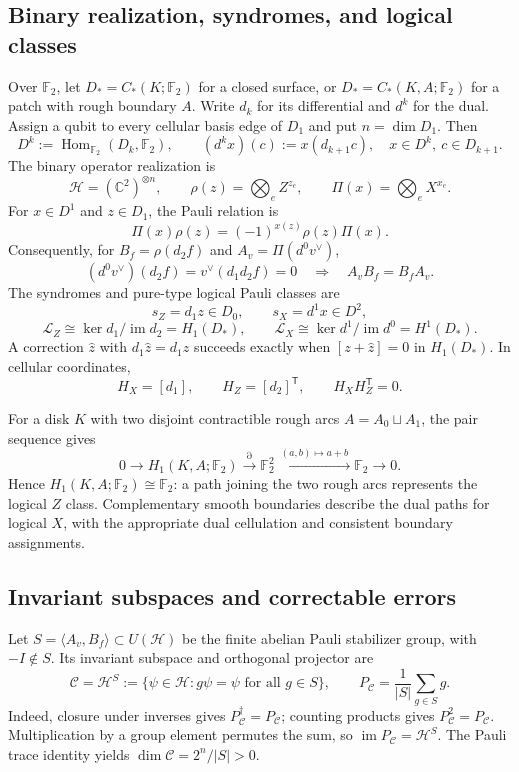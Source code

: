 \subsection*{Binary realization, syndromes, and logical classes}

Over $\mathbb F_2$, let $D_*=C_*(K;\mathbb F_2)$ for a closed surface,
or $D_*=C_*(K,A;\mathbb F_2)$ for a patch with rough boundary $A$.
Write $d_k$ for its differential and $d^k$ for the dual. Assign a qubit
to every cellular basis edge of $D_1$ and put $n=\dim D_1$. Then
\[
 D^k:=\operatorname{Hom}_{\mathbb F_2}(D_k,\mathbb F_2),
 \qquad (d^kx)(c):=x(d_{k+1}c),
 \quad x\in D^k,\ c\in D_{k+1}.
\]
The binary operator realization is
\[
 \mathcal H=(\mathbb C^2)^{\otimes n},
 \qquad \rho(z)=\bigotimes_e Z^{z_e},
 \qquad \Pi(x)=\bigotimes_e X^{x_e}.
\]
For $x\in D^1$ and $z\in D_1$, the Pauli relation is
\[
 \Pi(x)\rho(z)=(-1)^{x(z)}\rho(z)\Pi(x).
\]
Consequently, for $B_f=\rho(d_2f)$ and $A_v=\Pi(d^0v^\vee)$,
\[
 (d^0v^\vee)(d_2f)=v^\vee(d_1d_2f)=0
 \quad\Longrightarrow\quad A_vB_f=B_fA_v.
\]
The syndromes and pure-type logical Pauli classes are
\[
 s_Z=d_1z\in D_0,\qquad s_X=d^1x\in D^2,
\]
\[
 \mathcal L_Z\cong\ker d_1/\operatorname{im}d_2=H_1(D_*),
 \qquad \mathcal L_X\cong\ker d^1/\operatorname{im}d^0=H^1(D_*).
\]
A correction $\widehat z$ with $d_1\widehat z=d_1z$ succeeds exactly when
$[z+\widehat z]=0$ in $H_1(D_*)$. In cellular coordinates,
\[
 H_X=[d_1],\qquad H_Z=[d_2]^{\mathsf T},\qquad
 H_XH_Z^{\mathsf T}=0.
\]

For a disk $K$ with two disjoint contractible rough arcs
$A=A_0\sqcup A_1$, the pair sequence gives
\[
 0\longrightarrow H_1(K,A;\mathbb F_2)\xrightarrow{\partial}
 \mathbb F_2^2\xrightarrow{\ (a,b)\mapsto a+b\ }\mathbb F_2
 \longrightarrow0.
\]
Hence $H_1(K,A;\mathbb F_2)\cong\mathbb F_2$: a path joining the two
rough arcs represents the logical $Z$ class. Complementary smooth
boundaries describe the dual paths for logical $X$, with the appropriate
dual cellulation and consistent boundary assignments.

\subsection*{Invariant subspaces and correctable errors}

Let $S=\langle A_v,B_f\rangle\subset U(\mathcal H)$ be the finite
abelian Pauli stabilizer group, with $-I\notin S$. Its invariant
subspace and orthogonal projector are
\[
 \mathcal C=\mathcal H^S
 :=\{\psi\in\mathcal H:g\psi=\psi\text{ for all }g\in S\},
 \qquad
 P_{\mathcal C}=\frac1{|S|}\sum_{g\in S}g.
\]
Indeed, closure under inverses gives $P_{\mathcal C}^{\dagger}=P_{\mathcal C}$;
counting products gives $P_{\mathcal C}^2=P_{\mathcal C}$.
Multiplication by a group element permutes the sum, so
$\operatorname{im}P_{\mathcal C}=\mathcal H^S$.
The Pauli trace identity yields $\dim\mathcal C=2^n/|S|>0$.

